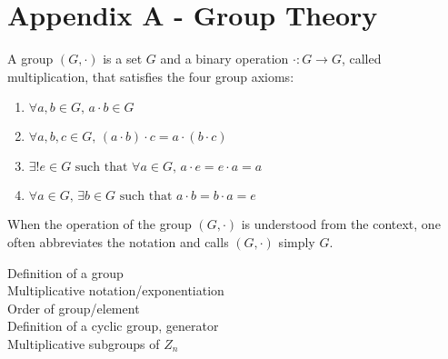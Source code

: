 \clearpage
\section{Appendix A - Group Theory}

A group $(G, \cdot)$ is a set $G$ and a binary operation $\cdot: G \to G$, called
multiplication, that satisfies the four group axioms:
\begin{enumerate}
\item $\forall a,b \in G, \, a\cdot b \in G$
\item $\forall a,b,c \in G, \, (a\cdot b)\cdot c = a \cdot (b \cdot c)$ 
\item $\exists! e \in G \text{ such that } \forall a \in G, \, a \cdot e = e \cdot a = a$
\item $\forall a \in G, \, \exists b \in G \text{ such that } a \cdot b = b \cdot a = e$
\end{enumerate}

When the operation of the group $(G, \cdot)$ is understood from the
context, one often abbreviates the notation and calls $(G, \cdot)$
simply $G$.


 Definition of a group\\ Multiplicative
notation/exponentiation\\ Order of group/element\\ Definition of a
cyclic group, generator\\ Multiplicative subgroups of $Z_n$
